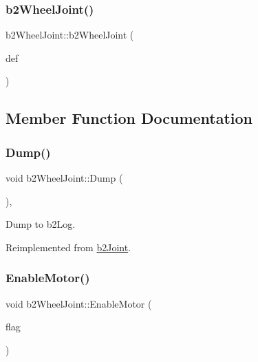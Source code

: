 \subsubsection{\texorpdfstring{b2WheelJoint()}{b2WheelJoint()}}
{\footnotesize\ttfamily b2\+Wheel\+Joint\+::b2\+Wheel\+Joint (\begin{DoxyParamCaption}\item[{const \mbox{\hyperlink{structb2_wheel_joint_def}{b2\+Wheel\+Joint\+Def}} $\ast$}]{def }\end{DoxyParamCaption})\hspace{0.3cm}{\ttfamily [protected]}}



\subsection{Member Function Documentation}
\mbox{\label{classb2_wheel_joint_a8295644bd733c28c8c9fa6390a367f3f}} 
\subsubsection{\texorpdfstring{Dump()}{Dump()}}
{\footnotesize\ttfamily void b2\+Wheel\+Joint\+::\+Dump (\begin{DoxyParamCaption}{ }\end{DoxyParamCaption})\hspace{0.3cm}{\ttfamily [override]}, {\ttfamily [virtual]}}



Dump to b2\+Log. 



Reimplemented from \mbox{\hyperlink{classb2_joint_abd35e7316017ad9a40d5dbf9b5ba3f36}{b2\+Joint}}.

\mbox{\label{classb2_wheel_joint_a7a832d814bdda135a78fad41ba671da6}} 
\subsubsection{\texorpdfstring{EnableMotor()}{EnableMotor()}}
{\footnotesize\ttfamily void b2\+Wheel\+Joint\+::\+Enable\+Motor (\begin{DoxyParamCaption}\item[{bool}]{flag }\end{DoxyParamCaption})}




